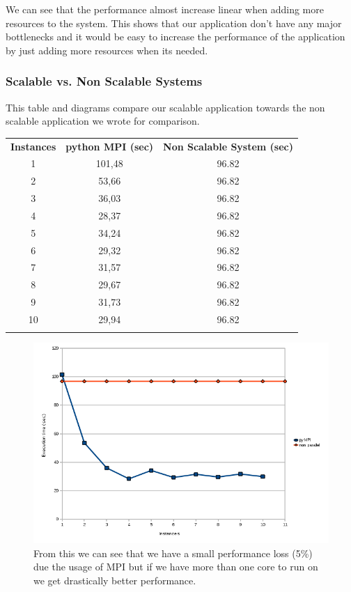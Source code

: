 \documentclass{article}
\begin{document}
{We can see that the performance almost increase linear when adding more
resources to the system. This shows that our application don't have any
major bottlenecks and it would be easy to increase the performance
of the application by just adding more resources when its needed.

\subsubsection{Scalable vs. Non Scalable Systems}
This table and diagrams compare our scalable application towards the non
scalable application we wrote for comparison.

\begin{table}[h!]
\begin{tabular}{c c c}
  \rowcolor[gray]{0.5}
  {\bf Instances} & {\bf python MPI (sec)} & {\bf Non Scalable System (sec)} \\
  1 & 101,48 & 96.82 \\
  2 & 53,66  & 96.82  \\
  3 & 36,03  & 96.82  \\
  4 & 28,37  & 96.82  \\
  5 & 34,24  & 96.82  \\
  6 & 29,32  & 96.82  \\
  7 & 31,57  & 96.82  \\
  8 & 29,67  & 96.82  \\
  9 & 31,73  & 96.82  \\
 10 & 29,94  & 96.82  \\
\rowcolor[gray]{0.5}
\end{tabular}
\end{table}
\begin{figure}[h!]
\includegraphics[width=\textwidth]{img/parallel-vs-non-parallel.png}
\center
\caption{From this we can see that we have a small performance loss (5\%) due the usage
of MPI but if we have more than one core to run on we get drastically better
performance.}
\end{figure}



}
\end{document}
